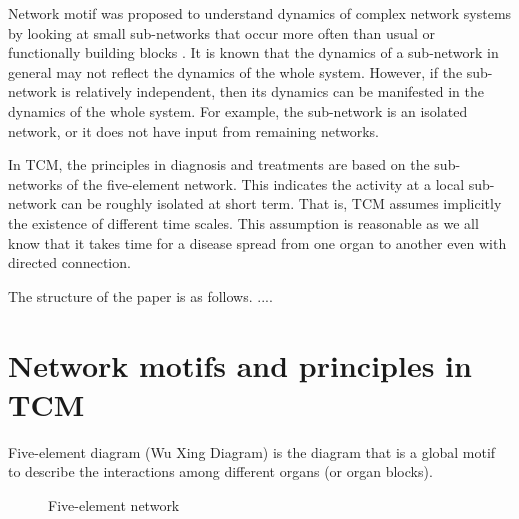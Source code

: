 \documentclass{article}
\begin{document}
Network motif was proposed to understand dynamics of complex network systems by looking at small sub-networks that occur more often than usual or functionally building blocks \cite{milo2002, Alon2007}. It is  known that the dynamics of a sub-network  in general may not reflect the dynamics of the whole system. However, if the  sub-network is relatively independent, then its dynamics can be manifested in the dynamics of the whole system.  For example, the sub-network is an isolated network, or it does not have input from remaining networks. 

In TCM, the principles in diagnosis and treatments are based on the sub-networks  of the five-element network.
This indicates the activity at a local sub-network can be roughly isolated at short term. That is, TCM assumes implicitly the existence of different time scales. This assumption is reasonable as we all know that it takes time for a disease spread from one organ to another even with directed connection. 



The structure of the paper is as follows. ....

\section{Network motifs and principles in TCM}

Five-element diagram (Wu Xing Diagram) is the diagram that is a global motif to describe the interactions among different organs (or organ blocks).  
\begin{figure}[!htb]
\centering
{}

\caption{Five-element network}
\label{F:WuXing}
\end{figure}
\end{document}
